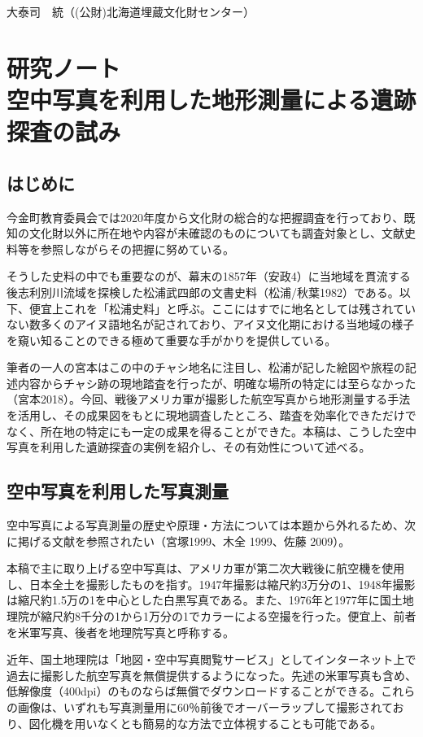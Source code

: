\documentclass[a4j,11pt,twocolumn,openany]{jsbook}
\begin{document}
\begin{flushright}
	大泰司　統（(公財)北海道埋蔵文化財センター）
\end{flushright}


\chapter{研究ノート\\空中写真を利用した地形測量による遺跡探査の試み}

\section{はじめに}
今金町教育委員会では2020年度から文化財の総合的な把握調査を行っており、既知の文化財以外に所在地や内容が未確認のものについても調査対象とし、文献史料等を参照しながらその把握に努めている。

そうした史料の中でも重要なのが、幕末の1857年（安政4）に当地域を貫流する後志利別川流域を探検した松浦武四郎の文書史料（松浦/秋葉1982）である。以下、便宜上これを「松浦史料」と呼ぶ。ここにはすでに地名としては残されていない数多くのアイヌ語地名が記されており、アイヌ文化期における当地域の様子を窺い知ることのできる極めて重要な手がかりを提供している。

筆者の一人の宮本はこの中のチャシ地名に注目し、松浦が記した絵図や旅程の記述内容からチャシ跡の現地踏査を行ったが、明確な場所の特定には至らなかった（宮本2018）。今回、戦後アメリカ軍が撮影した航空写真から地形測量する手法を活用し、その成果図をもとに現地調査したところ、踏査を効率化できただけでなく、所在地の特定にも一定の成果を得ることができた。本稿は、こうした空中写真を利用した遺跡探査の実例を紹介し、その有効性について述べる。

\section{空中写真を利用した写真測量}

空中写真による写真測量の歴史や原理・方法については本題から外れるため、次に掲げる文献を参照されたい（宮塚1999、木全 1999、佐藤 2009）。

本稿で主に取り上げる空中写真は、アメリカ軍が第二次大戦後に航空機を使用し、日本全土を撮影したものを指す。1947年撮影は縮尺約3万分の1、1948年撮影は縮尺約1.5万の1を中心とした白黒写真である。また、1976年と1977年に国土地理院が縮尺約8千分の1から1万分の1でカラーによる空撮を行った。便宜上、前者を米軍写真、後者を地理院写真と呼称する。

近年、国土地理院は「地図・空中写真閲覧サービス」としてインターネット上で過去に撮影した航空写真を無償提供するようになった。先述の米軍写真も含め、低解像度（400dpi）のものならば無償でダウンロードすることができる。これらの画像は、いずれも写真測量用に60％前後でオーバーラップして撮影されており、図化機を用いなくとも簡易的な方法で立体視することも可能である。
\end{document}
